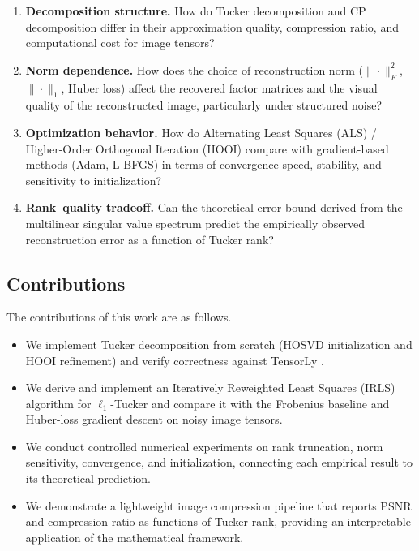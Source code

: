         \begin{enumerate}
            \item \textbf{Decomposition structure.}
                How do Tucker decomposition and CP decomposition differ in their approximation quality, compression ratio, and computational cost for image tensors?
            \item \textbf{Norm dependence.}
                How does the choice of reconstruction norm ($\|\cdot\|_F^2$, $\|\cdot\|_1$, Huber loss) affect the recovered factor matrices and the visual quality of the reconstructed image, particularly under structured noise?
            \item \textbf{Optimization behavior.}
                How do Alternating Least Squares (ALS) / Higher-Order Orthogonal Iteration (HOOI) compare with gradient-based methods (Adam, L-BFGS) in terms of convergence speed, stability, and sensitivity to initialization?
            \item \textbf{Rank--quality tradeoff.}
                Can the theoretical error bound derived from the multilinear singular value spectrum predict the empirically observed reconstruction error as a function of Tucker rank?
        \end{enumerate}

    \subsection*{Contributions}
        The contributions of this work are as follows.

        \begin{itemize}
            \item We implement Tucker decomposition from scratch (HOSVD initialization and HOOI refinement) and verify correctness against TensorLy \cite{kossaifi2019tensorly}.
            \item We derive and implement an Iteratively Reweighted Least Squares (IRLS) algorithm for $\ell_1$-Tucker and compare it with the Frobenius baseline and Huber-loss gradient descent on noisy image tensors.
            \item We conduct controlled numerical experiments on rank truncation, norm sensitivity, convergence, and initialization, connecting each empirical result to its theoretical prediction.
            \item We demonstrate a lightweight image compression pipeline that reports PSNR and compression ratio as functions of Tucker rank, providing an interpretable application of the mathematical framework.
        \end{itemize}

